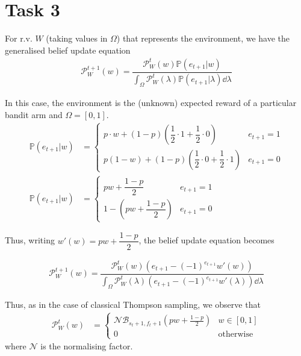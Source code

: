 \section*{Task 3}

For r.v. $W$ (taking values in $\Omega$) that represents the environment, we have the generalised belief update equation
\begin{align*}
    \mathcal{P}_W^{t + 1}(w) = \dfrac{\mathcal{P}_W^{t}(w)\mathbb{P}(e_{t+1} | w)}{\int_\Omega\mathcal{P}_W^{t}(\lambda)\mathbb{P}(e_{t+1} | \lambda)\dd\lambda}
\end{align*}

In this case, the environment is the (unknown) expected reward of a particular bandit arm and $\Omega=[0,1]$.
\begin{align*}
    \mathbb{P}(e_{t + 1} | w) &= \begin{cases}
        p\cdot w + (1 - p)\left(\dfrac{1}{2}\cdot 1 + \dfrac{1}{2}\cdot 0\right) & e_{t+1} = 1 \\
        p(1 - w) + (1 - p)\left(\dfrac{1}{2}\cdot 0 + \dfrac{1}{2}\cdot 1\right) & e_{t+1} = 0
    \end{cases} \\
    \mathbb{P}(e_{t + 1} | w) &= \begin{cases}
        pw + \dfrac{1 - p}{2} & e_{t+1} = 1 \\
        1 - \left(pw + \dfrac{1 - p}{2}\right) & e_{t+1} = 0
    \end{cases}
\end{align*}

Thus, writing $w'(w) = pw + \dfrac{1 - p}{2}$, the belief update equation becomes

\begin{align*}
    \mathcal{P}_W^{t + 1}(w) = \dfrac{\mathcal{P}_W^t(w)(e_{t+1} - (-1)^{e_{t+1}}w'(w))}{\int_\Omega\mathcal{P}_W^t(\lambda)(e_{t+1} - (-1)^{e_{t+1}}w'(\lambda))\dd\lambda}
\end{align*}

Thus, as in the case of classical Thompson sampling, we observe that
\begin{align*}
    \mathcal{P}_W^t(w) &= \begin{cases}
        \mathcal{N}\mathcal{B}_{s_t+1,f_t+1}\left(pw + \tfrac{1-p}{2}\right) & w\in[0,1] \\
        0 & \text{otherwise}
    \end{cases}
\end{align*}
where $\mathcal{N}$ is the normalising factor.

